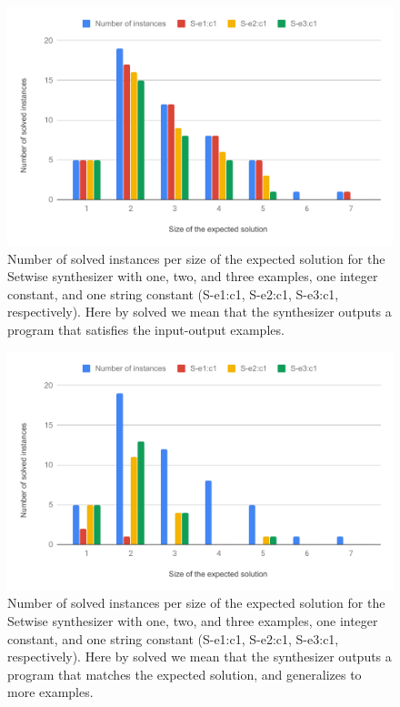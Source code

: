 \begin{figure}
  \centering
  \includegraphics[width=1.0\textwidth]{assets/bar-chart-solved-setwise.pdf}
  \caption{Number of solved instances per size of the expected solution for
    the Setwise synthesizer with one, two, and three examples, one integer
    constant, and one string constant (S-e1:c1, S-e2:c1, S-e3:c1, respectively).
    Here by solved we mean that the synthesizer outputs a program that satisfies the
    input-output examples.}
  \label{fig:bar-chart-solved-setwise}
\end{figure}

\begin{figure}
  \centering
  \includegraphics[width=1.0\textwidth]{assets/bar-chart-expected-setwise.pdf}
  \caption{Number of solved instances per size of the expected solution for
    the Setwise synthesizer with one, two, and three examples, one integer
    constant, and one string constant (S-e1:c1, S-e2:c1, S-e3:c1, respectively).
    Here by solved we mean that the synthesizer outputs a program that matches
    the expected solution, and generalizes to more examples.}
  \label{fig:bar-chart-expected-setwise}
\end{figure}

